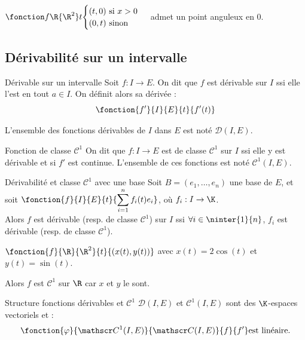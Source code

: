 \begin{exemple}
    $\fonction f \R {\R^2} t {\begin{cases} (t, 0)~\text{si}~x > 0\\(0,t)~\text{sinon}\end{cases}}$ admet un point anguleux en $0$.
\end{exemple}

\subsection{Dérivabilité sur un intervalle}

\begin{definition}{Dérivable sur un intervalle}{}
    Soit $f : I \to E$. On dit que $f$ est dérivable sur $I$ ssi elle l'est en tout $a \in I$. 
    On définit alors sa dérivée :
    \[\fonction{f'}{I}{E}{t}{f'(t)}\] 

    L'ensemble des fonctions dérivables de $I$ dans $E$ est noté $\mathscr D(I, E)$.
\end{definition}

\begin{definition}{Fonction de classe $\mathscr C^1$}{}
    On dit que $f : I \to E$ est de classe $\mathscr C^1$ sur $I$ ssi 
    elle y est dérivable et si $f'$ est continue.
    L'ensemble de ces fonctions est noté $\mathscr C^1(I, E)$.
\end{definition}

\begin{proposition}{Dérivabilité et classe $\mathscr C^1$ avec une base }{}
    Soit $B = (e_1, \ldots, e_n)$ une base de $E$, et soit
    $\displaystyle \fonction{f}{I}{E}{t}{\sum_{i=1}^n f_i(t)e_i}$, où $f_i : I \to \K$. \\

    Alors $f$ est dérivable (resp. de classe $\mathscr C^1$) sur $I$ ssi
    $\forall i \in \ninter{1}{n}$, $f_i$ est dérivable (resp. de classe $\mathscr C^1$).
\end{proposition}

\begin{exemple}
    $\fonction{f}{\R}{\R^2}{t}{(x(t), y(t))}$ avec $x(t) = 2 \cos(t)$ et $y(t) = \sin(t)$.

    Alors $f$ est $\mathscr C^1$ sur $\R$ car $x$ et $y$ le sont.
\end{exemple}


\begin{proposition}{Structure fonctions dérivables et $\mathscr C^1$}{}
    $\mathscr D(I, E)$ et $\mathscr C^1(I, E)$ sont des $\K$-espaces vectoriels et :
    \[\fonction{\varphi}{\mathscr C^1(I, E)}{\mathscr C(I, E)}{f}{f'} \text{est linéaire.}\] 
\end{proposition}

